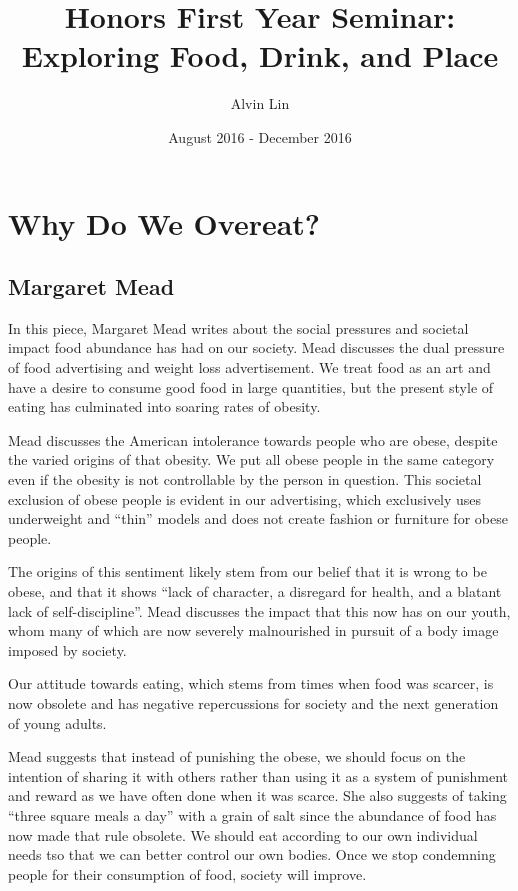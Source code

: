 \documentclass[letterpaper, 12pt]{article}
\title{Honors First Year Seminar: Exploring Food, Drink, and Place}
\author{Alvin Lin}
\date{August 2016 - December 2016}
\begin{document}
\maketitle

\section*{Why Do We Overeat?}
\subsection*{Margaret Mead}
In this piece, Margaret Mead writes about the social pressures and societal impact food abundance has had on our society. Mead discusses the dual pressure of food advertising and weight loss advertisement. We treat food as an art and have a desire to consume good food in large quantities, but the present style of eating has culminated into soaring rates of obesity. \par
Mead discusses the American intolerance towards people who are obese, despite the varied origins of that obesity. We put all obese people in the same category even if the obesity is not controllable by the person in question. This societal exclusion of obese people is evident in our advertising, which exclusively uses underweight and ``thin'' models and does not create fashion or furniture for obese people. \par
The origins of this sentiment likely stem from our belief that it is wrong to be obese, and that it shows ``lack of character, a disregard for health, and a blatant lack of self-discipline''. Mead discusses the impact that this now has on our youth, whom many of which are now severely malnourished in pursuit of a body image imposed by society. \par
Our attitude towards eating, which stems from times when food was scarcer, is now obsolete and has negative repercussions for society and the next generation of young adults. \par
Mead suggests that instead of punishing the obese, we should focus on the intention of sharing it with others rather than using it as a system of punishment and reward as we have often done when it was scarce. She also suggests of taking ``three square meals a day'' with a grain of salt since the abundance of food has now made that rule obsolete. We should eat according to our own individual needs tso that we can better control our own bodies. Once we stop condemning people for their consumption of food, society will improve.
\end{document}
